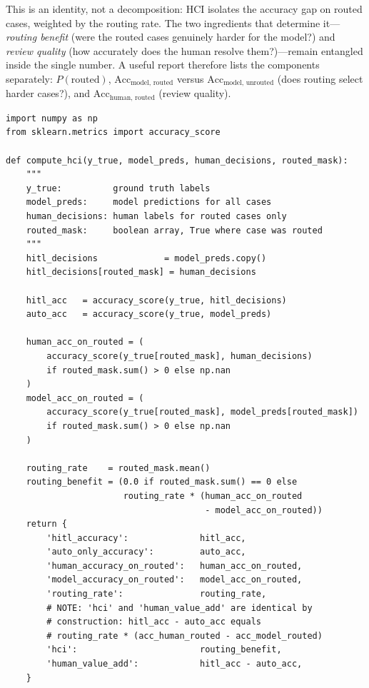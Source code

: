 This is an identity, not a decomposition: HCI isolates the accuracy gap on routed cases, weighted by the routing rate. The two ingredients that determine it---\emph{routing benefit} (were the routed cases genuinely harder for the model?) and \emph{review quality} (how accurately does the human resolve them?)---remain entangled inside the single number. A useful report therefore lists the components separately: $P(\text{routed})$, $\text{Acc}_\text{model, routed}$ versus $\text{Acc}_\text{model, unrouted}$ (does routing select harder cases?), and $\text{Acc}_\text{human, routed}$ (review quality).

\begin{lstlisting}[style=python, caption={Computing the Human Contribution Index}]
import numpy as np
from sklearn.metrics import accuracy_score

def compute_hci(y_true, model_preds, human_decisions, routed_mask):
    """
    y_true:          ground truth labels
    model_preds:     model predictions for all cases
    human_decisions: human labels for routed cases only
    routed_mask:     boolean array, True where case was routed
    """
    hitl_decisions             = model_preds.copy()
    hitl_decisions[routed_mask] = human_decisions

    hitl_acc   = accuracy_score(y_true, hitl_decisions)
    auto_acc   = accuracy_score(y_true, model_preds)

    human_acc_on_routed = (
        accuracy_score(y_true[routed_mask], human_decisions)
        if routed_mask.sum() > 0 else np.nan
    )
    model_acc_on_routed = (
        accuracy_score(y_true[routed_mask], model_preds[routed_mask])
        if routed_mask.sum() > 0 else np.nan
    )

    routing_rate    = routed_mask.mean()
    routing_benefit = (0.0 if routed_mask.sum() == 0 else
                       routing_rate * (human_acc_on_routed
                                       - model_acc_on_routed))
    return {
        'hitl_accuracy':              hitl_acc,
        'auto_only_accuracy':         auto_acc,
        'human_accuracy_on_routed':   human_acc_on_routed,
        'model_accuracy_on_routed':   model_acc_on_routed,
        'routing_rate':               routing_rate,
        # NOTE: 'hci' and 'human_value_add' are identical by
        # construction: hitl_acc - auto_acc equals
        # routing_rate * (acc_human_routed - acc_model_routed)
        'hci':                        routing_benefit,
        'human_value_add':            hitl_acc - auto_acc,
    }
\end{lstlisting}

